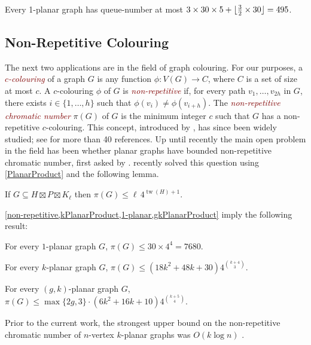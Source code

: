 \documentclass{patmorin}
\newcommand{\defin}[1]{\textcolor{Maroon}{\emph{#1}}}
\DeclareMathOperator{\tw}{tw}
\DeclarePairedDelimiter{\floor}{\lfloor}{\rfloor}
\renewcommand{\le}{\leqslant}
\begin{document}
\begin{cor}
\label{1PlanarQueue}
Every 1-planar graph has queue-number at most $3 \times 30 \times 5 + \floor{\tfrac{3}{2} \times 30} = 495$.
\end{cor}


\subsection{Non-Repetitive Colouring}

The next two applications are in the field of graph colouring. For our purposes, a \defin{$c$-colouring} of a graph $G$ is any function $\phi\colon V(G)\to C$, where $C$ is a set of size at most $c$.
A $c$-colouring $\phi$ of $G$ is \defin{non-repetitive} if, for every path $v_1,\ldots,v_{2h}$ in $G$, there exists $i\in\{1,\ldots,h\}$ such that $\phi(v_i)\neq\phi(v_{i+h})$.  The \defin{non-repetitive chromatic number} $\pi(G)$ of $G$ is the minimum integer $c$ such that $G$ has a non-repetitive $c$-colouring. This concept, introduced by \citet{AGHR-RSA02}, has since been widely studied; see \citep{dujmovic.esperet.ea:planar} for more than 40 references. Up until recently the main open problem in the field has been whether planar graphs have bounded non-repetitive chromatic number, first asked by \citet{AGHR-RSA02}. \citet{dujmovic.esperet.ea:planar} recently solved this question using \cref{PlanarProduct} and the following lemma.

\begin{lem}
\label{non-repetitive}
If $G\subseteq H\boxtimes P \boxtimes K_\ell$ then $\pi(G)\le \ell\, 4^{\tw(H)+1}$.
\end{lem}

\cref{non-repetitive,kPlanarProduct,1-planar,gkPlanarProduct} imply the following result:

\begin{cor}\quad
\begin{compactitem}
\item	For every $1$-planar graph $G$, $\pi(G)\le 30\times 4^4=7680$.
\item For every $k$-planar graph $G$,
	$\pi(G)\le (18k^2+48k+30) 4^{\binom{k+4}{3}}$.
\item	For every $(g,k)$-planar graph $G$,
	$  \pi(G)\le \max\{2g,3\}\cdot(6k^2+16k+10) 4^{\binom{k+5}{4}}.$
\end{compactitem}
\end{cor}

Prior to the current work, the strongest upper bound on the non-repetitive chromatic number of $n$-vertex  $k$-planar graphs was $O(k\log n)$ \cite{dujmovic.morin.ea:layered}.
\end{document}
